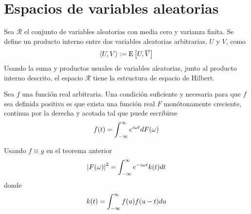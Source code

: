 \section{Espacios de variables aleatorias}

\begin{proposicion}
Sea $\mathcal{R}$ el conjunto de variables aleatorias con media cero y varianza finita. Se define un producto interno entre dos variables aleatorias arbitrarias, $U$ y $V$, como
\begin{equation}
\langle U , V \rangle := \mathrm{E}\left[ U, \overline{V} \right]
\end{equation}
Usando la suma y productos usuales de variables aleatorias, junto al producto interno descrito, el espacio $\mathcal{R}$ tiene la estructura de espacio de Hilbert.
\end{proposicion}

\begin{teorema}[Bochner]
Sea $f$ una función real arbitraria. Una condición suficiente y necesaria para que $f$ sea definida positiva es que exista una función real $F$ monótonamente creciente, continua por la derecha y acotada tal que puede escribirse
\begin{equation}
f(t) = \int_{-\infty}^{\infty} e^{i \omega t} dF(\omega)
\end{equation}
\end{teorema}


\begin{corolario}
Usando $f \equiv g$ en el teorema anterior
\begin{equation}
\left| F(\omega) \right|^{2} = \int_{-\infty}^{\infty} e^{- i \omega t} k(t) dt 
\end{equation}
donde 
\begin{equation}
k(t) = \int_{-\infty}^{\infty} f(u) f(u-t) du
\end{equation}
\end{corolario}

